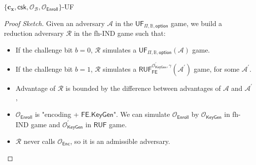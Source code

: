 \begin{frame}{$\{ \mathbf{c_x}, \textsf{csk}, \mathcal{O}_\mathcal{B}, \mathcal{O}_{\textsf{Enroll}} \}$-UF}

\begin{proof}[Proof Sketch]

Given an adversary $\mathcal{A}$ in the $\textsf{UF}_{\Pi, \mathbb{B}, \textsf{option}}$ game, we build a reduction adversary $\mathcal{R}$ in the fh-IND game such that:

\begin{itemize}
	\item<2-> If the challenge bit $b = 0$, $\mathcal{R}$ simulates a $\textsf{UF}_{\Pi, \mathbb{B}, \textsf{option}}(\mathcal{A})$ game.

	\item<3-> If the challenge bit $b = 1$, $\mathcal{R}$ simulates a $\textsf{RUF}^{\mathcal{O}^\prime_{\textsf{KeyGen}}, \gamma}_{\textsf{FE}}(\mathcal{A}^\prime)$ game, for some $\mathcal{A}^\prime$.

	\item<4-> Advantage of $\mathcal{R}$ is bounded by the difference between advantages of $\mathcal{A}$ and $\mathcal{A}^\prime$, \visible<5->{and
	\[
		\Adv^{\textsf{UF}}_{\Pi, \mathbb{B}, \mathcal{A}, \textsf{option}} \leq 4 \cdot \Adv_{\textsf{FE}, \mathcal{R}}^{\textsf{fh-IND}} + \Adv_{\textsf{FE}, \mathcal{A}^\prime}^{\textsf{RUF},\mathcal{O}^\prime_{\textsf{KeyGen}}, \gamma} = \negl.
	\] \vskip -10pt }
	\item<6-> $\mathcal{O}_{\textsf{Enroll}}$ is "encoding + $\textsf{FE.KeyGen}$". We can simulate $\mathcal{O}_{\textsf{Enroll}}$ by $\mathcal{O}_{\textsf{KeyGen}}$ in fh-IND game and $\mathcal{O}^\prime_{\textsf{KeyGen}}$ in $\textsf{RUF}$ game. 
	
	\item<7-> $\mathcal{R}$ never calls $\mathcal{O}_{\textsf{Enc}}$, so it is an admissible adversary.

\end{itemize}

\end{proof}

\end{frame}



